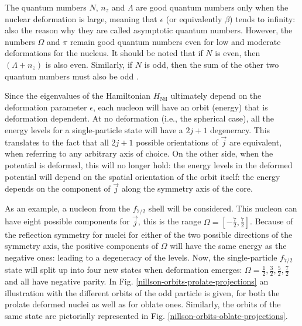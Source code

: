 The quantum numbers $N$, $n_z$ and $\Lambda$ are good quantum numbers only when the nuclear deformation is large, meaning that $\epsilon$ (or equivalently $\beta$) tends to infinity: also the reason why they are called asymptotic quantum numbers. However, the numbers $\Omega$ and $\pi$ remain good quantum numbers even for low and moderate deformations for the nucleus. It should be noted that if $N$ is even, then $(\Lambda+n_z)$ is also even. Similarly, if $N$ is odd, then the sum of the other two quantum numbers must also be odd \cite{casten2000nuclear}.

Since the eigenvalues of the Hamiltonian $H_\text{Nil}$ ultimately depend on the deformation parameter $\epsilon$, each nucleon will have an orbit (energy) that is deformation dependent. At no deformation (i.e., the spherical case), all the energy levels for a single-particle state will have a $2j+1$ degeneracy. This translates to the fact that all $2j+1$ possible orientations of $\vec{j}$ are equivalent, when referring to any arbitrary axis of choice. On the other side, when the potential is deformed, this will no longer hold: the energy levels in the deformed potential will depend on the spatial orientation of the orbit itself: the energy depends on the component of $\vec{j}$ along the symmetry axis of the core. 

As an example, a nucleon from the $f_{7/2}$ shell will be considered. This nucleon can have eight possible components for $\vec{j}$, this is the range $\Omega=[-\frac{7}{2},\frac{7}{2}]$. Because of the reflection symmetry for nuclei for either of the two possible directions of the symmetry axis, the positive components of $\Omega$ will have the same energy as the negative ones: leading to a degeneracy of the levels. Now, the single-particle $f_{7/2}$ state will split up into four new states when deformation emerges: $\Omega=\frac{1}{2},\frac{3}{2},\frac{5}{2},\frac{7}{2}$ and all have negative parity. In Fig. \ref{nillson-orbits-prolate-projections} an illustration with the different orbits of the odd particle is given, for both the prolate deformed nuclei as well as for oblate ones. Similarly, the orbits of the same state are pictorially represented in Fig. \ref{nillson-orbits-oblate-projections}.

